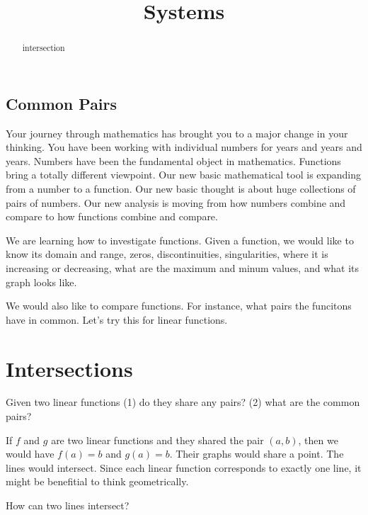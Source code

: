 \documentclass{ximera}
\title{Systems}
\begin{document}
\begin{abstract}
intersection
\end{abstract}
\maketitle



\subsection{Common Pairs}

Your journey through mathematics has brought you to a major change in your thinking. You have been working with individual numbers for years and years and years. Numbers have been the fundamental object in mathematics. Functions bring a totally different viewpoint. Our new basic mathematical tool is expanding from a number to a function.  Our new basic thought is about huge collections of pairs of numbers.  Our new analysis is moving from how numbers combine and compare to how functions combine and compare.

We are learning how to investigate functions.  Given a function, we would like to know its domain and range, zeros, discontinuities, singularities, where it is increasing or decreasing, what are the maximum and minum values, and what its graph looks like.

We would also like to compare functions.  For instance, what pairs the funcitons have in common. Let's try this for linear functions.



\section{Intersections}

Given two linear functions (1) do they share any pairs? (2) what are the common pairs?



If $f$ and $g$ are two linear functions and they shared the pair $(a, b)$, then we would have $f(a)=b$ and $g(a)=b$.  Their graphs would share a point. The lines would intersect. Since each linear function corresponds to exactly one line, it might be benefitial to think geometrically.  

How can two lines intersect?
\end{document}
